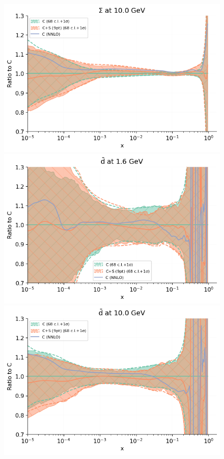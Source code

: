 \begin{figure}[H]
\begin{center}
            \includegraphics[scale=0.45]{mhous/plots/jplots/pdfscalespecs0_basespecs1_pdfnormalize0_plot_pdfs_Sigma2.png}
    \includegraphics[scale=0.45]{mhous/plots/jplots/pdfscalespecs0_basespecs0_pdfnormalize0_plot_pdfs_bard.png}
         \includegraphics[scale=0.45]{mhous/plots/jplots/pdfscalespecs0_basespecs0_pdfnormalize0_plot_pdfs_bard2.png}

\end{center}
\end{figure}
